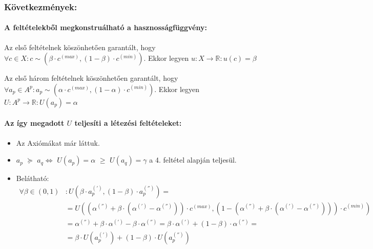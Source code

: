 \documentclass[a4paper,12pt]{article}
\begin{document}
\subsubsection{Következmények: }

\paragraph{A feltételekből megkonstruálható a hasznosságfüggvény: }

Az első feltételnek köszönhetően garantált, hogy $\forall c \in X: c \sim (\beta \cdot c^{(max)}, (1-\beta) \cdot c^{(min)})$. Ekkor legyen $u: X \rightarrow \mathbb{R} : u(c) = \beta$


Az első három feltételnek köszönhetően garantált, hogy $\forall a_p \in A^p: a_p \sim (\alpha \cdot c^{(max)}, (1-\alpha)\cdot c^{(min)})$. Ekkor legyen $U: A^p \rightarrow \mathbb{R} : U(a_p) = \alpha$ 


\paragraph{Az így megadott $U$ teljesíti a létezési feltételeket: }
\begin{itemize}
\item Az Axiómákat már láttuk. 
\item $a_p$  $\succeq$ $a_q \Leftrightarrow $ $U(a_p) = \alpha$  $\geq$ $U(a_q) = \gamma$ a 4. feltétel alapján teljesül.
\item Belátható: \begin{equation}
\begin{split} 
\forall  \beta \in (0,1)&: U(\beta\cdot a^{(')}_p , (1-\beta)\cdot a^{('')}_p ) = \\
 & = U((\alpha^{('')} + \beta\cdot (\alpha^{(')} - \alpha^{('')} ))\cdot c^{(max)},(1 - (\alpha^{('')} + \beta\cdot (\alpha^{(')} - \alpha^{('')} )))\cdot c^{(min)}) \\
 & = \alpha^{('')} + \beta\cdot \alpha^{(')} - \beta\cdot \alpha^{('')} = \beta\cdot \alpha^{(')} + (1-\beta) \cdot  \alpha^{('')} = \\
 & =  \beta\cdot U(a^{(')}_p) + (1-\beta)\cdot U(a^{('')}_p)\\
\end{split}
\end{equation} 
\end{itemize}
\end{document}
